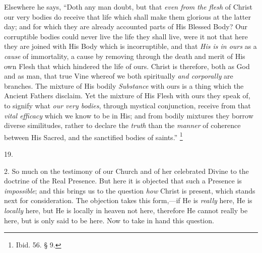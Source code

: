 Elsewhere he says, ``Doth any man doubt, but that \emph{even
from the flesh} of Christ our very bodies do receive that life
which shall make them glorious at the latter day; and for which they
are already accounted parts of His Blessed Body? Our corruptible
bodies could never live the life they shall live, were it not that
here they are joined with His Body which is incorruptible, and that \emph{His
is in ours} as a \emph{cause} of immortality, a cause by removing
through the death and merit of His own Flesh that which hindered the
life of ours. Christ is therefore, both as God and as man, that true
Vine whereof we both spiritually \emph{and corporally} are branches.
The mixture of His bodily \emph{Substance} with ours is a thing which
the Ancient Fathers disclaim. Yet the mixture of His Flesh with ours
they speak of, to signify what \emph{our very bodies}, through
mystical conjunction, receive from that \emph{vital efficacy} which we
know to be in His; and from bodily mixtures they borrow diverse
similitudes, rather to declare the \emph{truth} than the \emph{manner}
of coherence between His Sacred, and the sanctified bodies of saints.''
\footnote{Ibid. 56. § 9.}

19.

2. So much on the testimony of our Church and of
her celebrated Divine to the doctrine of the Real Presence. But here
it is objected that such a Presence is \emph{impossible}; and this
brings us to the question \emph{how} Christ is present, which stands
next for consideration. The objection takes this form,—if He is \emph{really}
here, He is \emph{locally} here, but He is locally in heaven not here,
therefore He cannot really be here, but is only said to be here. Now
to take in hand this question.

